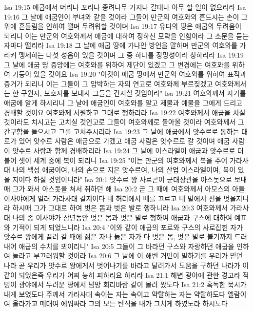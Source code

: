 Isa 19:15  애굽에서 머리나 꼬리나 종려나무 가지나 갈대나 아무 할 일이 없으리라
Isa 19:16  그 날에 애굽인이 부녀와 같을 것이라 그들이 만군의 여호와의 흔드시는 손이 그 위에 흔들림을 인하여 떨며 두려워할 것이며
Isa 19:17  유다의 땅은 애굽의 두려움이 되리니 이는 만군의 여호와께서 애굽에 대하여 정하신 모략을 인함이라 그 소문을 듣는 자마다 떨리라
Isa 19:18  그 날에 애굽 땅에 가나안 방언을 말하며 만군의 여호와를 가리켜 맹세하는 다섯 성읍이 있을 것이며 그 중 하나를 장망성이라 칭하리라
Isa 19:19  그 날에 애굽 땅 중앙에는 여호와를 위하여 제단이 있겠고 그 변경에는 여호와를 위하여 기둥이 있을 것이요
Isa 19:20  "이것이 애굽 땅에서 만군의 여호와를 위하여 표적과 증거가 되리니 이는 그들이 그 압박하는 자의 연고로 여호와께 부르짖겠고 여호와께서는 한 구원자, 보호자를 보내사 그들을 건지실 것임이라"
Isa 19:21  여호와께서 자기를 애굽에 알게 하시리니 그 날에 애굽인이 여호와를 알고 제물과 예물을 그에게 드리고 경배할 것이요 여호와께 서원하고 그대로 행하리라
Isa 19:22  여호와께서 애굽을 치실 것이라도 치시고는 고치실 것인고로 그들이 여호와께로 돌아올 것이라 여호와께서 그 간구함을 들으시고 그를 고쳐주시리라
Isa 19:23  그 날에 애굽에서 앗수르로 통하는 대로가 있어 앗수르 사람은 애굽으로 가겠고 애굽 사람은 앗수르로 갈 것이며 애굽 사람이 앗수르 사람과 함께 경배하리라
Isa 19:24  그 날에 이스라엘이 애굽과 앗수르로 더불어 셋이 세계 중에 복이 되리니
Isa 19:25  "이는 만군의 여호와께서 복을 주어 가라사대 나의 백성 애굽이여, 나의 손으로 지은 앗수르여, 나의 산업 이스라엘이여, 복이 있을 지어다 하실 것임이니라"
Isa 20:1  앗수르 왕 사르곤이 군대장관을 아스돗으로 보내매 그가 와서 아스돗을 쳐서 취하던 해
Isa 20:2  곧 그 때에 여호와께서 아모스의 아들 이사야에게 일러 가라사대 갈지어다 네 허리에서 베를 끄르고 네 발에서 신을 벗을지니라 하시매 그가 그대로 하여 벗은 몸과 벗은 발로 행하니라
Isa 20:3  여호와께서 가라사대 나의 종 이사야가 삼년동안 벗은 몸과 벗은 발로 행하여 애굽과 구스에 대하여 예표와 기적이 되게 되었느니라
Isa 20:4  "이와 같이 애굽의 포로와 구스의 사로잡힌 자가 앗수르 왕에게 끌려 갈 때에 젊은 자나 늙은 자가 다 벗은 몸, 벗은 발로 볼기까지 드러내어 애굽의 수치를 뵈이리니"
Isa 20:5  그들이 그 바라던 구스와 자랑하던 애굽을 인하여 놀라고 부끄러워할 것이라
Isa 20:6  그 날에 이 해변 거민이 말하기를 우리가 믿던 나라 곧 우리가 앗수르 왕에게서 벗어나기를 바라고 달려가서 도움을 구하던 나라가 이같이 되었은즉 우리가 어찌 능히 피하리요 하리라
Isa 21:1  해변 광야에 관한 경고라 적병이 광야에서 두려운 땅에서 남방 회리바람 같이 몰려 왔도다
Isa 21:2  혹독한 묵시가 내게 보였도다 주께서 가라사대 속이는 자는 속이고 약탈하는 자는 약탈하도다 엘람이여 올라가고 메대여 에워싸라 그의 모든 탄식을 내가 그치게 하였노라 하시도다
